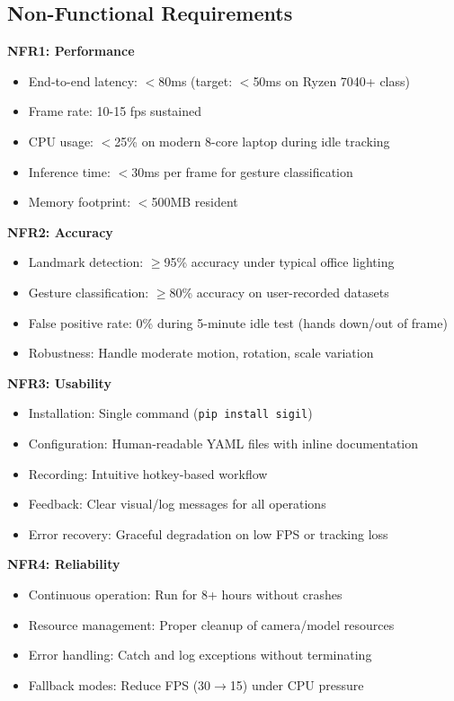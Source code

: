 \documentclass[11pt,a4paper]{article}
\begin{document}
\subsection{Non-Functional Requirements}

\textbf{NFR1: Performance}
\begin{itemize}
\item End-to-end latency: $<$80ms (target: $<$50ms on Ryzen 7040+ class)
\item Frame rate: 10-15 fps sustained
\item CPU usage: $<$25\% on modern 8-core laptop during idle tracking
\item Inference time: $<$30ms per frame for gesture classification
\item Memory footprint: $<$500MB resident
\end{itemize}

\textbf{NFR2: Accuracy}
\begin{itemize}
\item Landmark detection: $\geq$95\% accuracy under typical office lighting
\item Gesture classification: $\geq$80\% accuracy on user-recorded datasets
\item False positive rate: 0\% during 5-minute idle test (hands down/out of frame)
\item Robustness: Handle moderate motion, rotation, scale variation
\end{itemize}

\textbf{NFR3: Usability}
\begin{itemize}
\item Installation: Single command (\texttt{pip install sigil})
\item Configuration: Human-readable YAML files with inline documentation
\item Recording: Intuitive hotkey-based workflow
\item Feedback: Clear visual/log messages for all operations
\item Error recovery: Graceful degradation on low FPS or tracking loss
\end{itemize}

\textbf{NFR4: Reliability}
\begin{itemize}
\item Continuous operation: Run for 8+ hours without crashes
\item Resource management: Proper cleanup of camera/model resources
\item Error handling: Catch and log exceptions without terminating
\item Fallback modes: Reduce FPS (30$\rightarrow$15) under CPU pressure
\end{itemize}
\end{document}
